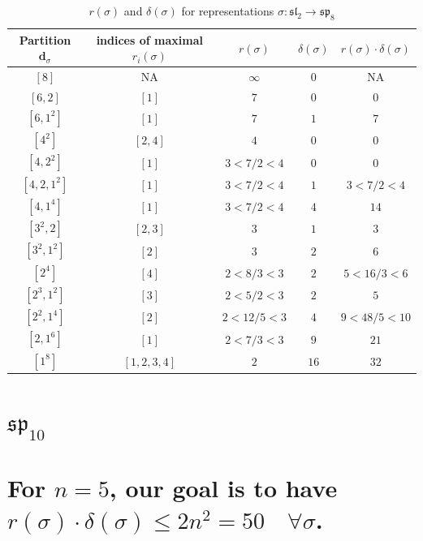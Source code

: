 \documentclass{article}%
\begin{document}
    \begin{center}
    \label{table:sp_8}
    \begin{longtable}{||c|c|c|c|c||}
    \caption{$r(\sigma)$ and $\delta(\sigma)$ for representations $\sigma: \mathfrak{sl}_2 \to \mathfrak{sp}_{8}$}
    \hline
    Partition $\textbf{d}_\sigma$
    &indices of maximal $r_i(\sigma)$
    &$r(\sigma)$
    &$\delta(\sigma)$
    &$r(\sigma) \cdot \delta(\sigma)$
    \\ [0.3ex] \hline\endhead
    $[8]$ & NA & $\infty$ & $0$ & NA \\ \hline 
$[6, 2]$ & $[1]$ & $7$ & $0$ & $0$ \\ \hline 
$[6, 1^{2}]$ & $[1]$ & $7$ & $1$ & $7$ \\ \hline 
$[4^{2}]$ & $[2, 4]$ & $4$ & $0$ & $0$ \\ \hline 
$[4, 2^{2}]$ & $[1]$ & $3 < 7/2 < 4$ & $0$ & $0$ \\ \hline 
$[4, 2, 1^{2}]$ & $[1]$ & $3 < 7/2 < 4$ & $1$ & $3 < 7/2 < 4$ \\ \hline 
$[4, 1^{4}]$ & $[1]$ & $3 < 7/2 < 4$ & $4$ & $14$ \\ \hline 
$[3^{2}, 2]$ & $[2, 3]$ & $3$ & $1$ & $3$ \\ \hline 
$[3^{2}, 1^{2}]$ & $[2]$ & $3$ & $2$ & $6$ \\ \hline 
$[2^{4}]$ & $[4]$ & $2 < 8/3 < 3$ & $2$ & $5 < 16/3 < 6$ \\ \hline 
$[2^{3}, 1^{2}]$ & $[3]$ & $2 < 5/2 < 3$ & $2$ & $5$ \\ \hline 
$[2^{2}, 1^{4}]$ & $[2]$ & $2 < 12/5 < 3$ & $4$ & $9 < 48/5 < 10$ \\ \hline 
$[2, 1^{6}]$ & $[1]$ & $2 < 7/3 < 3$ & $9$ & $21$ \\ \hline 
$[1^{8}]$ & $[1, 2, 3, 4]$ & $2$ & $16$ & $32$ \\ \hline 
    \end{longtable}
    \end{center}
\newpage

%
\section{$\mathfrak{sp}_{10}$}%
\section*{For $n=5$, our goal is to have $r(\sigma) \cdot \delta(\sigma) \leq 2n^2 = 50 \quad \forall \sigma$.}%

%
\linebreak%
\end{document}
